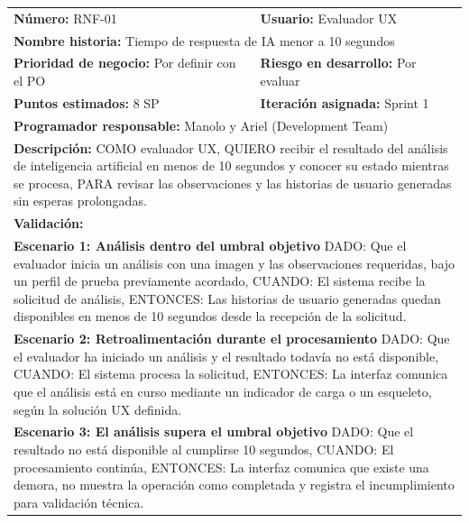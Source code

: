 \documentclass[12pt,a4paper]{article}
\begin{document}
\vspace{0.5cm}
\begin{longtable}{|p{}|p{}|}
\hline
\rowcolor{gray!20}
\multicolumn{2}{|l|}{\textbf{Historia de Usuario: RNF-01 -- Tiempo de respuesta de IA}} \\ \hline
\textbf{Número:} RNF-01 & \textbf{Usuario:} Evaluador UX \\ \hline
\multicolumn{2}{|l|}{\textbf{Nombre historia:} Tiempo de respuesta de IA menor a 10 segundos} \\ \hline
\textbf{Prioridad de negocio:} Por definir con el PO & \textbf{Riesgo en desarrollo:} Por evaluar \\ \hline
\textbf{Puntos estimados:} 8 SP & \textbf{Iteración asignada:} Sprint 1 \\ \hline
\multicolumn{2}{|l|}{\textbf{Programador responsable:} Manolo y Ariel (Development Team)} \\ \hline
\multicolumn{2}{|p{0.9\textwidth}|}{
\textbf{Descripción:}\newline
COMO evaluador UX,\newline
QUIERO recibir el resultado del análisis de inteligencia artificial en menos de 10 segundos y conocer su estado mientras se procesa,\newline
PARA revisar las observaciones y las historias de usuario generadas sin esperas prolongadas.
} \\ \hline
\multicolumn{2}{|l|}{\textbf{Validación:}} \\ \hline
\multicolumn{2}{|p{0.9\textwidth}|}{
\textbf{Escenario 1: Análisis dentro del umbral objetivo}\newline
DADO: Que el evaluador inicia un análisis con una imagen y las observaciones requeridas, bajo un perfil de prueba previamente acordado,\newline
CUANDO: El sistema recibe la solicitud de análisis,\newline
ENTONCES: Las historias de usuario generadas quedan disponibles en menos de 10 segundos desde la recepción de la solicitud.
} \\ \hline
\multicolumn{2}{|p{0.9\textwidth}|}{
\textbf{Escenario 2: Retroalimentación durante el procesamiento}\newline
DADO: Que el evaluador ha iniciado un análisis y el resultado todavía no está disponible,\newline
CUANDO: El sistema procesa la solicitud,\newline
ENTONCES: La interfaz comunica que el análisis está en curso mediante un indicador de carga o un esqueleto, según la solución UX definida.
} \\ \hline
\multicolumn{2}{|p{0.9\textwidth}|}{
\textbf{Escenario 3: El análisis supera el umbral objetivo}\newline
DADO: Que el resultado no está disponible al cumplirse 10 segundos,\newline
CUANDO: El procesamiento continúa,\newline
ENTONCES: La interfaz comunica que existe una demora, no muestra la operación como completada y registra el incumplimiento para validación técnica.
} \\ \hline
\end{longtable}
\end{document}
